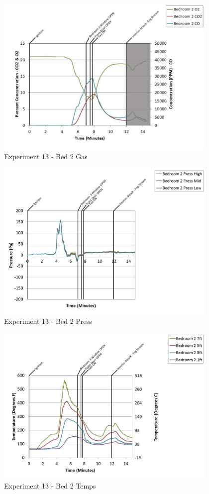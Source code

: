 \documentclass{article}
\begin{document}
\begin{appendices}
	\clearpage

	\begin{figure}[h!]
		\centering
		\includegraphics[height=3.05in]{0_Images/Results_Charts/Exp_13_Charts/Bed2Gas.pdf}
		\caption{Experiment 13 - Bed 2 Gas}
	\end{figure}
 

	\begin{figure}[h!]
		\centering
		\includegraphics[height=3.05in]{0_Images/Results_Charts/Exp_13_Charts/Bed2Press.pdf}
		\caption{Experiment 13 - Bed 2 Press}
	\end{figure}
 
	\clearpage

	\begin{figure}[h!]
		\centering
		\includegraphics[height=3.05in]{0_Images/Results_Charts/Exp_13_Charts/Bed2Temps.pdf}
		\caption{Experiment 13 - Bed 2 Temps}
	\end{figure}
 


\end{appendices}
\end{document}
